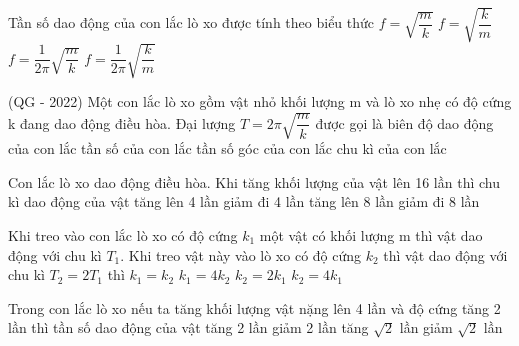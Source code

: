 \setcounter{ex}{0}
\setcounter{paragraph}{0}
\PhanI

\begin{ex} %
Tần số dao động của con lắc lò xo được tính theo biểu thức
\choice
{$f=\sqrt{\dfrac{m}{k}} $}
{$f=\sqrt{\dfrac{k}{m}} $}
{$f=\dfrac{1}{2\pi}\sqrt{\dfrac{m}{k}} $}
{\True $f=\dfrac{1}{2\pi}\sqrt{\dfrac{k}{m}} $}
\end{ex} 
\begin{ex} 
(QG - 2022) Một con lắc lò xo gồm vật nhỏ khối lượng m và lò xo nhẹ có độ cứng k đang dao động điều hòa. Đại lượng $T=2\pi \sqrt{\dfrac{m}{k}}$ được gọi là
\choice
{biên độ dao động của con lắc}
{tần số của con lắc}
{tần số góc của con lắc}
{\True chu kì của con lắc}
\end{ex} 

\begin{ex}%
Con lắc lò xo dao động điều hòa. Khi tăng khối lượng của vật lên 16 lần thì chu kì dao động của vật
\choice
{\True tăng lên 4 lần}
{giảm đi 4 lần}
{tăng lên 8 lần}
{giảm đi 8 lần}
\end{ex} 


\begin{ex} %
Khi treo vào con lắc lò xo có độ cứng $k_1$ một vật có khối lượng m thì vật dao động với chu kì $T_1$. Khi treo vật này vào lò xo có độ cứng $k_2$ thì vật dao động với chu kì $T_2 = 2T_1$ thì
\choice
{$k_1 = k_2$}
{\True $k_1 = 4k_2$}
{$k_2 = 2k_1$}
{$k_2 = 4k_1$}
\end{ex} 

\begin{ex} %
Trong con lắc lò xo nếu ta tăng khối lượng vật nặng lên 4 lần và độ cứng tăng 2 lần thì tần số dao động của vật
\choice
{tăng 2 lần}
{giảm 2 lần}
{tăng $\sqrt{2}$ lần}
{\True giảm $\sqrt{2}$ lần}

\end{ex} 


